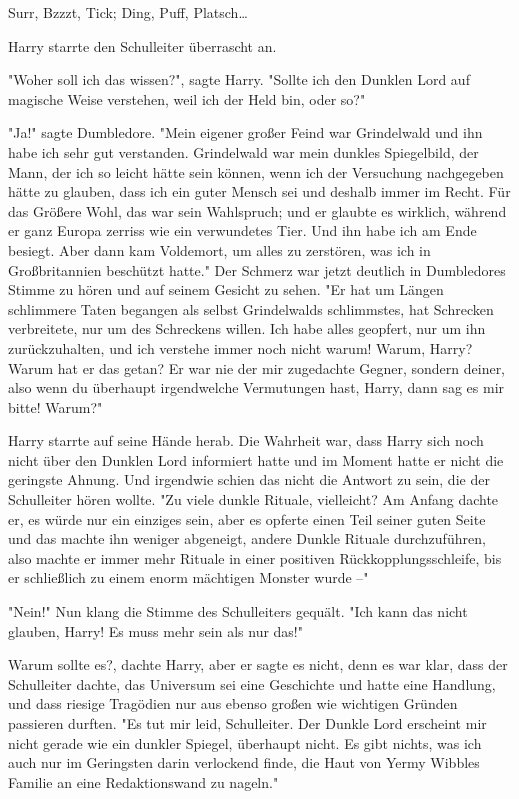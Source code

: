 {Surr, Bzzzt, Tick; Ding, Puff, Platsch…

Harry starrte den Schulleiter überrascht an.

"Woher soll ich das wissen?", sagte Harry. "Sollte ich den Dunklen Lord auf magische Weise verstehen, weil ich der Held bin, oder so?"

"Ja!" sagte Dumbledore. "Mein eigener großer Feind war Grindelwald und ihn habe ich sehr gut verstanden. Grindelwald war mein dunkles Spiegelbild, der Mann, der ich so leicht hätte sein können, wenn ich der Versuchung nachgegeben hätte zu glauben, dass ich ein guter Mensch sei und deshalb immer im Recht. Für das Größere Wohl, das war sein Wahlspruch; und er glaubte es wirklich, während er ganz Europa zerriss wie ein verwundetes Tier. Und ihn habe ich am Ende besiegt. Aber dann kam Voldemort, um alles zu zerstören, was ich in Großbritannien beschützt hatte." Der Schmerz war jetzt deutlich in Dumbledores Stimme zu hören und auf seinem Gesicht zu sehen. "Er hat um Längen schlimmere Taten begangen als selbst Grindelwalds schlimmstes, hat Schrecken verbreitete, nur um des Schreckens willen. Ich habe alles geopfert, nur um ihn zurückzuhalten, und ich verstehe immer noch nicht warum! Warum, Harry? Warum hat er das getan? Er war nie der mir zugedachte Gegner, sondern deiner, also wenn du überhaupt irgendwelche Vermutungen hast, Harry, dann sag es mir bitte! Warum?"

Harry starrte auf seine Hände herab. Die Wahrheit war, dass Harry sich noch nicht über den Dunklen Lord informiert hatte und im Moment hatte er nicht die geringste Ahnung. Und irgendwie schien das nicht die Antwort zu sein, die der Schulleiter hören wollte. "Zu viele dunkle Rituale, vielleicht? Am Anfang dachte er, es würde nur ein einziges sein, aber es opferte einen Teil seiner guten Seite und das machte ihn weniger abgeneigt, andere Dunkle Rituale durchzuführen, also machte er immer mehr Rituale in einer positiven Rückkopplungsschleife, bis er schließlich zu einem enorm mächtigen Monster wurde --"

"Nein!" Nun klang die Stimme des Schulleiters gequält. "Ich kann das nicht glauben, Harry! Es muss mehr sein als nur das!"

Warum sollte es?, dachte Harry, aber er sagte es nicht, denn es war klar, dass der Schulleiter dachte, das Universum sei eine Geschichte und hatte eine Handlung, und dass riesige Tragödien nur aus ebenso großen wie wichtigen Gründen passieren durften. "Es tut mir leid, Schulleiter. Der Dunkle Lord erscheint mir nicht gerade wie ein dunkler Spiegel, überhaupt nicht. Es gibt nichts, was ich auch nur im Geringsten darin verlockend finde, die Haut von Yermy Wibbles Familie an eine Redaktionswand zu nageln."

}
